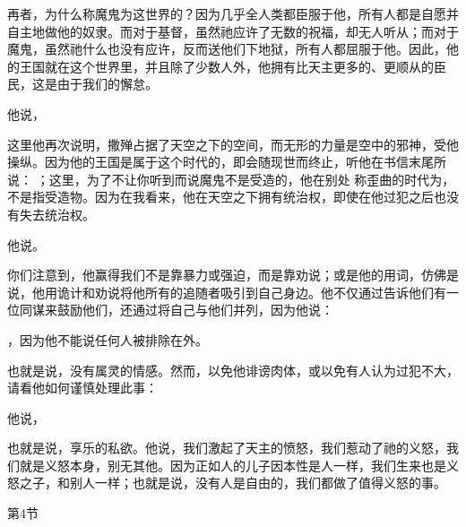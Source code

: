 再者，为什么称魔鬼为这世界的？因为几乎全人类都臣服于他，所有人都是自愿并自主地做他的奴隶。而对于基督，虽然祂应许了无数的祝福，却无人听从；而对于魔鬼，虽然祂什么也没有应许，反而送他们下地狱，所有人都屈服于他。因此，他的王国就在这个世界里，并且除了少数人外，他拥有比天主更多的、更顺从的臣民，这是由于我们的懈怠。\par

他说，\par

这里他再次说明，撒殚占据了天空之下的空间，而无形的力量是空中的邪神，受他操纵。因为他的王国是属于这个时代的，即会随现世而终止，听他在书信末尾所说： ；这里，为了不让你听到而说魔鬼不是受造的，他在别处  称歪曲的时代为，不是指受造物。因为在我看来，他在天空之下拥有统治权，即使在他过犯之后也没有失去统治权。\par

他说。\par

你们注意到，他赢得我们不是靠暴力或强迫，而是靠劝说；或是他的用词，仿佛是说，他用诡计和劝说将他所有的追随者吸引到自己身边。他不仅通过告诉他们有一位同谋来鼓励他们，还通过将自己与他们并列，因为他说：\par

\par

，因为他不能说任何人被排除在外。\par

\par

也就是说，没有属灵的情感。然而，以免他诽谤肉体，或以免有人认为过犯不大，请看他如何谨慎处理此事：\par

他说，\par

也就是说，享乐的私欲。他说，我们激起了天主的愤怒，我们惹动了祂的义怒，我们就是义怒本身，别无其他。因为正如人的儿子因本性是人一样，我们生来也是义怒之子，和别人一样；也就是说，没有人是自由的，我们都做了值得义怒的事。\par

第4节  \par

